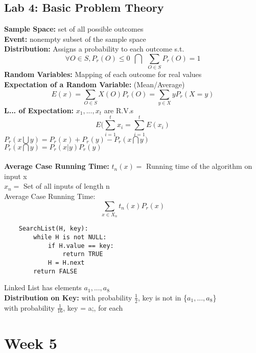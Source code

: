 \documentclass{article}
\begin{document}
	\subsection{Lab 4: Basic Problem Theory}
	\textbf{Sample Space: }set of all possible outcomes\\
	\textbf{Event: }nonempty subset of the sample space\\
	\textbf{Distribution: }Assigns a probability to each outcome s.t. $$\forall O\in S, P_r (O) \le 0 ~~\bigcap~~ \sum_{O\in S} P_r (O) = 1$$
	\textbf{Random Variables: }Mapping of each outcome for real values\\
	\textbf{Expectation of a Random Variable: }(Mean/Average) $$E(x)=\sum_{O\in S} X(O) P_r(O) = \sum_{y\in X} yP_r(X=y)$$
	\textbf{L... of Expectation: } $x_1,...,x_t$ are R.V.s $$E(\sum_{i=1}^{t} x_i = \sum_{i=1}^{t} E(x_i)$$
	$P_r(x\bigcup y) = P_r(x) + P_r(y) - P_r(x\bigcap y)$\\
	$P_r(x\bigcap y) = P_r(x|y)P_r(y)$\\\\
	\textbf{Average Case Running Time: }$t_n(x) =$ Running time of the algorithm on input x\\
	$x_n=$ Set of all inputs of length n\\
	Average Case Running Time: $$\sum_{x\in X_n} t_n(x)P_r(x)$$
	\begin{lstlisting}
	SearchList(H, key):
		while H is not NULL:
			if H.value == key:
				return TRUE
			H = H.next
		return FALSE
	\end{lstlisting}
	Linked List has elements $a_1,...,a_8$\\
	\textbf{Distribution on Key: }with probability $\frac{1}{2}$, key is not in \{$a_1,...,a_8$\}\\
	with probability $\frac{1}{16}$, key = a;, for each\\
	\section{Week 5}
\end{document}
